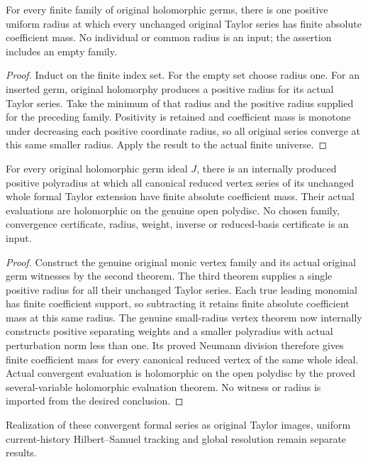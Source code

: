 \begin{theorem}
\label{hir:actual-original-finite-family-coefficient-radius}
\leanok
For every finite family of original holomorphic germs, there is one
positive uniform radius at which every unchanged original Taylor
series has finite absolute coefficient mass. No individual or common
radius is an input; the assertion includes an empty family.
\end{theorem}
\begin{proof}
Induct on the finite index set. For the empty set choose radius one.
For an inserted germ, original holomorphy produces a positive radius
for its actual Taylor series. Take the minimum of that radius and
the positive radius supplied for the preceding family. Positivity
is retained and coefficient mass is monotone under decreasing each
positive coordinate radius, so all original series converge at this
same smaller radius. Apply the result to the actual finite universe.
\end{proof}

\begin{theorem}
\label{hir:actual-original-ideal-reduced-vertex-convergence}
\leanok
For every original holomorphic germ ideal $J$, there is an internally
produced positive polyradius at which all canonical reduced vertex
series of its unchanged whole formal Taylor extension have finite
absolute coefficient mass. Their actual evaluations are holomorphic
on the genuine open polydisc. No chosen family, convergence certificate,
radius, weight, inverse or reduced-basis certificate is an input.
\end{theorem}
\begin{proof}
Construct the genuine original monic vertex family and its actual
original germ witnesses by the second theorem. The third theorem
supplies a single positive radius for all their unchanged Taylor
series. Each true leading monomial has finite coefficient support,
so subtracting it retains finite absolute coefficient mass at this
same radius. The genuine small-radius vertex theorem now internally
constructs positive separating weights and a smaller polyradius with
actual perturbation norm less than one. Its proved Neumann division
therefore gives finite coefficient mass for every canonical reduced
vertex of the same whole ideal. Actual convergent evaluation is
holomorphic on the open polydisc by the proved several-variable
holomorphic evaluation theorem. No witness or radius is imported
from the desired conclusion.
\end{proof}

Realization of these convergent formal series as original Taylor
images, uniform current-history Hilbert--Samuel tracking and global
resolution remain separate results.
